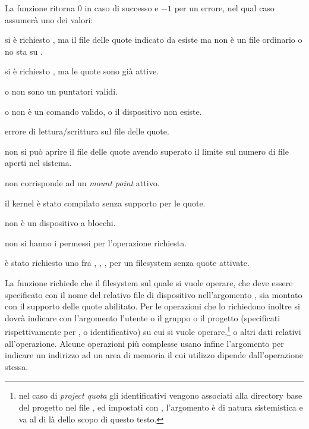 \begin{funcproto}{
}

{La funzione ritorna $0$ in caso di successo e $-1$ per un errore, nel qual
  caso  assumerà uno dei valori: 
  \begin{errlist}
  \item[\errcode{EACCES}] si è richiesto , ma il file delle
    quote indicato da  esiste ma non è un file ordinario o no sta
    su .
  \item[\errcode{EBUSY}] si è richiesto , ma le quote sono
    già attive.
  \item[\errcode{EFAULT}]  o  non sono un puntatori
    validi. 
  \item[\errcode{EINVAL}] o  non è un comando valido,
    o il dispositivo  non esiste.
  \item[\errcode{EIO}] errore di lettura/scrittura sul file delle quote.
  \item[\errcode{EMFILE}] non si può aprire il file delle quote avendo
    superato il limite sul numero di file aperti nel sistema. 
  \item[\errcode{ENODEV}]  non corrisponde ad un \textit{mount
      point} attivo.
  \item[\errcode{ENOPKG}] il kernel è stato compilato senza supporto per le
    quote. 
  \item[\errcode{ENOTBLK}]  non è un dispositivo a blocchi.
  \item[\errcode{EPERM}] non si hanno i permessi per l'operazione richiesta.
  \item[\errcode{ESRCH}] è stato richiesto uno fra ,
    , ,  per un
    filesystem senza quote attivate.
  \end{errlist}
}
\end{funcproto}


La funzione richiede che il filesystem sul quale si vuole operare, che deve
essere specificato con il nome del relativo file di dispositivo nell'argomento
, sia montato con il supporto delle quote abilitato. Per le
operazioni che lo richiedono inoltre si dovrà indicare con l'argomento
 l'utente o il gruppo o il progetto (specificati rispettivamente per
,  o identificativo) su cui si vuole operare,\footnote{nel
  caso di \textit{project quota} gli identificativi vengono associati alla
  directory base del progetto nel file , ed impostati con
  , l'argomento è di natura sistemistica e va al di là dello
  scopo di questo testo.} o altri dati relativi all'operazione. Alcune
operazioni più complesse usano infine l'argomento  per indicare un
indirizzo ad un area di memoria il cui utilizzo dipende dall'operazione
stessa.

